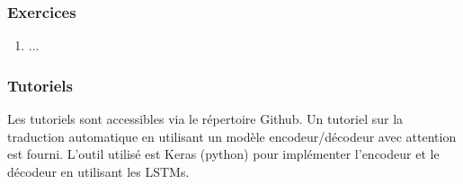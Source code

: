 \documentclass{KodeBook}
\begin{document}

\subsubsection*{Exercices}

\begin{enumerate}
	\item ...
	
\end{enumerate}

\subsubsection*{Tutoriels}

Les tutoriels sont accessibles via le répertoire Github.
Un tutoriel sur la traduction automatique en utilisant un modèle encodeur/décodeur avec attention est fourni.
L'outil utilisé est Keras (python) pour implémenter l'encodeur et le décodeur en utilisant les LSTMs.




\ifx\wholebook\relax\else
% 
% 
	
\end{document}
